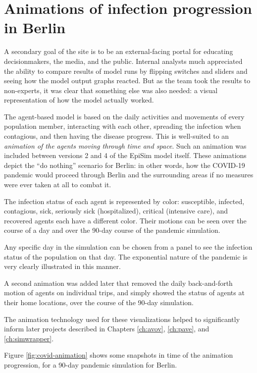 \hypertarget{covid-animations-of-infection-progression-in-berlin}{%
\section{Animations of infection progression in Berlin}\label{animations-of-infection-progression-in-berlin}}

A secondary goal of the site is to be an external-facing portal for educating decisionmakers, the media, and the public. Internal analysts much appreciated the ability to compare results of model runs by flipping switches and sliders and seeing how the model output graphs reacted. But as the team took the results to non-experts, it was clear that something else was also needed: a visual representation of how the model actually worked.

The agent-based model is based on the daily activities and movements of every population member, interacting with each other, spreading the infection when contagious, and then having the disease progress. This is well-suited to an \emph{animation of the agents moving through time and space}. Such an animation was included between versions 2 and 4 of the EpiSim model itself. These animations depict the ``do nothing'' scenario for Berlin: in other words, how the COVID-19 pandemic would proceed through Berlin and the surrounding areas if no measures were ever taken at all to combat it.

The infection status of each agent is represented by color: susceptible, infected, contagious, sick, seriously sick (hospitalized), critical (intensive care), and recovered agents each have a different color. Their motions can be seen over the course of a day and over the 90-day course of the pandemic simulation.

Any specific day in the simulation can be chosen from a panel to see the infection status of the population on that day. The exponential nature of the pandemic is very clearly illustrated in this manner.

A second animation was added later that removed the daily back-and-forth motion of agents on individual trips, and simply showed the status of agents at their home locations, over the course of the 90-day simulation.

The animation technology used for these visualizations helped to significantly inform later projects described in Chapters \ref{ch:avov}, \ref{ch:pave}, and \ref{ch:simwrapper}.

Figure \ref{fig:covid-animation} shows some snapshots in time of the animation progression, for a 90-day pandemic simulation for Berlin.

